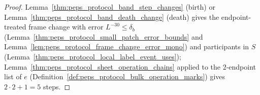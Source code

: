 \begin{proof}\leanok
    Lemma~\ref{thm:peps_protocol_band_step_changes} (birth) or Lemma~\ref{thm:peps_protocol_band_death_change} (death) gives the endpoint-treated frame change with error $L^{-30}\le\delta_b$ (Lemma~\ref{thm:peps_protocol_small_patch_error_bounds} and Lemma~\ref{lem:peps_protocol_frame_change_error_mono}) and participants in $S$ (Lemma~\ref{thm:peps_protocol_local_label_event_uses}); Lemma~\ref{thm:peps_protocol_sheet_operation_chains} applied to the $2$-endpoint list of $e$ (Definition~\ref{def:peps_protocol_bulk_operation_marks}) gives $2\cdot2+1=5$ steps.
\end{proof}

